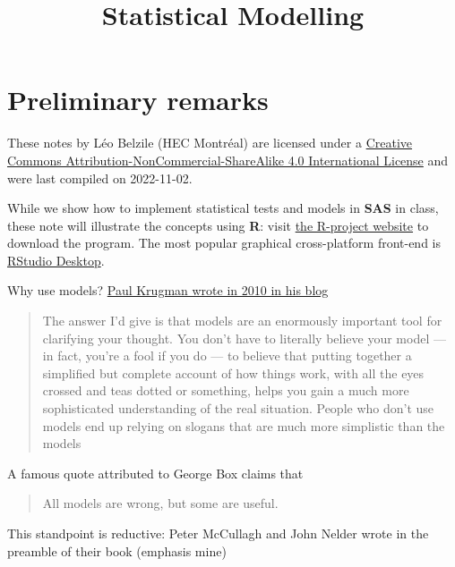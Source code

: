 \documentclass[
  11pt,
  letterpaper,
]{book}
\title{Statistical Modelling}
\author{}
\date{\vspace{-2.5em}}
\let\oldhref\href
\renewcommand{\href}[2]{#2\footnote{\url{#1}}}
\theoremstyle{definition}
\theoremstyle{definition}
\theoremstyle{definition}
\theoremstyle{definition}
\theoremstyle{remark}
\begin{document}
\maketitle

\let\href\oldhref

{
\setcounter{tocdepth}{1}
\tableofcontents
}
\hypertarget{preliminary-remarks}{%
\chapter*{Preliminary remarks}\label{preliminary-remarks}}

These notes by Léo Belzile (HEC Montréal) are licensed under a \href{http://creativecommons.org/licenses/by-nc-sa/4.0/}{Creative Commons Attribution-NonCommercial-ShareAlike 4.0 International License} and were last compiled on 2022-11-02.

While we show how to implement statistical tests and models in \textbf{SAS} in class, these note will illustrate the concepts using \textbf{R}: visit \href{https://cran.r-project.org/}{the R-project website} to download the program. The most popular graphical cross-platform front-end is \href{https://www.rstudio.com/products/rstudio/download/}{RStudio Desktop}.

Why use models? \href{https://krugman.blogs.nytimes.com/2010/11/18/debt-deleveraging-and-the-liquidity-trap/}{Paul Krugman wrote in 2010 in his blog}

\begin{quote}
The answer I'd give is that models are an enormously important tool for clarifying your thought. You don't have to literally believe your model --- in fact, you're a fool if you do --- to believe that putting together a simplified but complete account of how things work, with all the eyes crossed and teas dotted or something, helps you gain a much more sophisticated understanding of the real situation. People who don't use models end up relying on slogans that are much more simplistic than the models
\end{quote}

A famous quote attributed to George Box claims that

\begin{quote}
All models are wrong, but some are useful.
\end{quote}

This standpoint is reductive: Peter McCullagh and John Nelder wrote in the preamble of their book (emphasis mine)
\end{document}
